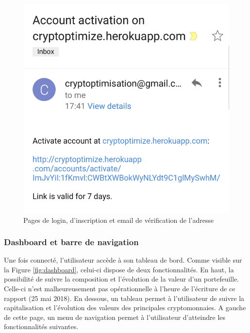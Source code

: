 \documentclass[a4paper, 10pt]{article}
\begin{document}
\begin{figure}[ht!]
\begin{center}
\begin{minipage}[b]{0.30\textwidth}
\end{minipage}\hfill
\begin{minipage}[b]{0.30\textwidth}
\includegraphics[scale=0.17]{images/mail.jpg}
\end{minipage}
\caption{Pages de login, d'inscription et email de vérification de l'adresse}
\label{fig:login}
\end{center}
\end{figure}

\subsubsection{Dashboard et barre de navigation}
\label{sec:developpement_pages_dashboard}

Une fois connecté, l'utilisateur accède à son tableau de bord. Comme visible sur la Figure \ref{fig:dashboard}, celui-ci dispose de deux fonctionnalités. En haut, la possibilité de suivre la composition et l'évolution de la valeur d'un portefeuille. Celle-ci n'est malheureusement pas opérationnelle à l'heure de l'écriture de ce rapport (25 mai 2018). En dessous, un tableau permet à l'utilisateur de suivre la capitalisation et l'évolution des valeurs des principales cryptomonnaies. A gauche de cette page, un menu de navigation permet à l'utilisateur d'atteindre les fonctionnalités suivantes.
\end{document}
